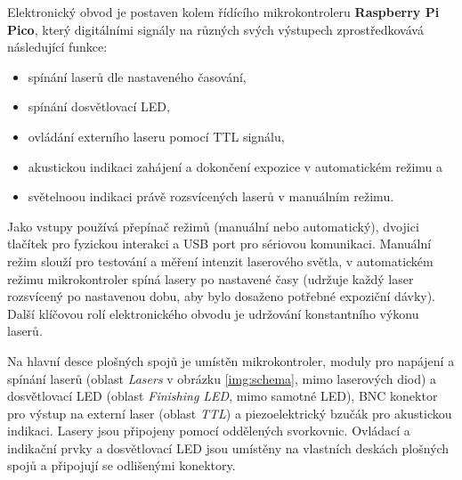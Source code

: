 \documentclass[twoside,project]{../MFFPrace}
\begin{document}
Elektronický obvod je postaven kolem řídícího mikrokontroleru \textbf{Raspberry Pi Pico}, který digitálními signály na různých svých výstupech zprostředkovává následující funkce:
\begin{itemize}
    \item spínání laserů dle nastaveného časování,
    \item spínání dosvětlovací LED,
    \item ovládání externího laseru pomocí TTL signálu,
    \item akustickou indikaci zahájení a dokončení expozice v automatickém režimu a
    \item světelnoou indikaci právě rozsvícených laserů v manuálním režimu.
\end{itemize}
Jako vstupy používá přepínač režimů (manuální nebo automatický), dvojici tlačítek pro fyzickou interakci a USB port pro sériovou komunikaci. Manuální režim slouží pro testování a měření intenzit laserového světla, v automatickém režimu mikrokontroler spíná lasery po nastavené časy (udržuje každý laser rozsvícený po nastavenou dobu, aby bylo dosaženo potřebné expoziční dávky). Další klíčovou rolí elektronického obvodu je udržování konstantního výkonu laserů.

\medskip

Na hlavní desce plošných spojů je umístěn mikrokontroler, moduly pro napájení a spínání laserů (oblast \textit{Lasers} v obrázku \ref{img:schema}, mimo laserových diod) a dosvětlovací LED (oblast \textit{Finishing LED}, mimo samotné LED), BNC konektor pro výstup na externí laser (oblast \textit{TTL}) a piezoelektrický bzučák pro akustickou indikaci. Lasery jsou připojeny pomocí oddělených svorkovnic. Ovládací a indikační prvky a dosvětlovací LED jsou umístěny na vlastních deskách plošných spojů a připojují se odlišenými konektory.
\end{document}
